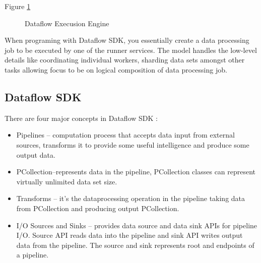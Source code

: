 \documentclass[9pt,twocolumn,twoside]{../../styles/osajnl}
\begin{document}
Figure \ref{fig:false-color}

\begin{figure}[htbp]
\centering
{}
\caption{Dataflow Execusion Engine \cite{www-beamincubate}}
\label{fig:false-color}
\end{figure}

When programing with Dataflow SDK, you essentially create a data
processing job to be executed by one of the runner services. The model
handles the low-level details like coordinating individual workers,
sharding data sets amongst other tasks allowing focus to be on logical
composition of data processing job.

\subsection{Dataflow SDK}

There are four major concepts in Dataflow SDK \cite{www-sdkmodel}:

\begin{itemize}
\renewcommand{\labelitemi}{\scriptsize$\square$}

\item Pipelines – computation process that accepts data input from
  external sources, transforms it to provide some useful intelligence
  and produce some output data.
\item PCollection–represents data in the pipeline, PCollection classes
  can represent virtually unlimited data set size.
\item Transforms – it’s the dataprocessing operation in the pipeline
  taking data from PCollection and producing output PCollection.
\item I/O Sources and Sinks – provides data source and data sink APIs
  for pipeline I/O. Source API reads data into the pipeline and sink
  API writes output data from the pipeline. The source and sink
  represents root and endpoints of a pipeline.
  
\end{itemize}
\end{document}
